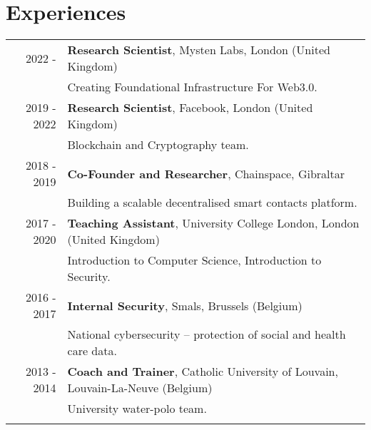 \documentclass[a4paper,10pt]{article}
\newcommand\tablegap{1ex}
\begin{document}
\section{Experiences}
\begin{tabular}{rp{13cm}}
  2022 -      & \textbf{Research Scientist}, Mysten Labs, London (United Kingdom)                      \\
              & \footnotesize{Creating Foundational Infrastructure For Web3.0.}                        \\
  \addlinespace[\tablegap]

  2019 - 2022 & \textbf{Research Scientist}, Facebook, London (United Kingdom)                         \\
              & \footnotesize{Blockchain and Cryptography team.}                                       \\
  \addlinespace[\tablegap]

  2018 - 2019 & \textbf{Co-Founder and Researcher}, Chainspace, Gibraltar                              \\
              & \footnotesize{Building a scalable decentralised smart contacts platform.}              \\
  \addlinespace[\tablegap]

  2017 - 2020 & \textbf{Teaching Assistant}, University College London, London (United Kingdom)        \\
              & \footnotesize{Introduction to Computer Science, Introduction to Security.}             \\
  \addlinespace[\tablegap]


  2016 - 2017 & \textbf{Internal Security}, Smals, Brussels (Belgium)                                  \\
              & \footnotesize{National cybersecurity -- protection of social and health care data.}    \\
  \addlinespace[\tablegap]

  2013 - 2014 & \textbf{Coach and Trainer}, Catholic University of Louvain, Louvain-La-Neuve (Belgium) \\
              & \footnotesize{University water-polo team.}                                             \\
  \addlinespace[\tablegap]

\end{tabular}
\end{document}
